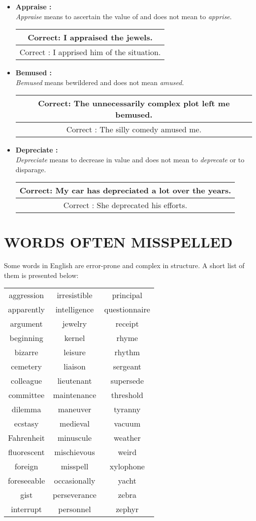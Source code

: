 \documentclass{report}
\newcommand{\DoubleRowSingleCol}[2]{
    \begin{center}
    \begin{tabular}{|c|}
     \hline
     #1\\\hline
     #2\\\hline
    \end{tabular}
    \end{center}
}
\begin{document}
\begin{itemize}
    \item
    \textbf{\Large{Appraise :}}\\    
    \textit{Appraise} means to ascertain the value of and does not mean to \textit{apprise}.
    \DoubleRowSingleCol
    {Correct: I appraised the jewels.}
    {Correct : I apprised him of the situation.}
    \bigskip
    
    \item
    \textbf{\Large{Bemused :}}\\    
    \textit{Bemused} means bewildered and does not mean \textit{amused.}

    \DoubleRowSingleCol
    {Correct: The unnecessarily complex plot left me bemused.}
    {Correct : The silly comedy amused me.}
    \bigskip
    
    \item
    \textbf{\Large{Depreciate :}}\\  
    \textit{Depreciate} means to decrease in value and does not mean to \textit{deprecate} or to disparage.
    
    \DoubleRowSingleCol
    {Correct: My car has depreciated a lot over the years.}
    {Correct : She deprecated his efforts.}
\end{itemize}


\chapter{WORDS OFTEN MISSPELLED}
Some words in English are error-prone and complex in structure. A short list of them is presented below:

\bigskip
\fontsize{15}{18}

\begin{center}
\begin{tabular}{c c c}
 aggression & irresistible & principal\\
 apparently	& intelligence & questionnaire \\
 argument & jewelry & receipt\\
 beginning & kernel & rhyme\\
 bizarre & leisure & rhythm \\
 cemetery & liaison & sergeant \\
 colleague & lieutenant & supersede\\
 committee & maintenance & threshold\\
 dilemma & maneuver & tyranny\\
 ecstasy & medieval & vacuum\\
 Fahrenheit & minuscule & weather\\
 fluorescent & mischievous & weird\\
 foreign & misspell & xylophone\\
 foreseeable & occasionally & yacht\\
 gist & perseverance & zebra\\
 interrupt & personnel & zephyr\\
\end{tabular}
\end{center}
\bigskip
\end{document}
